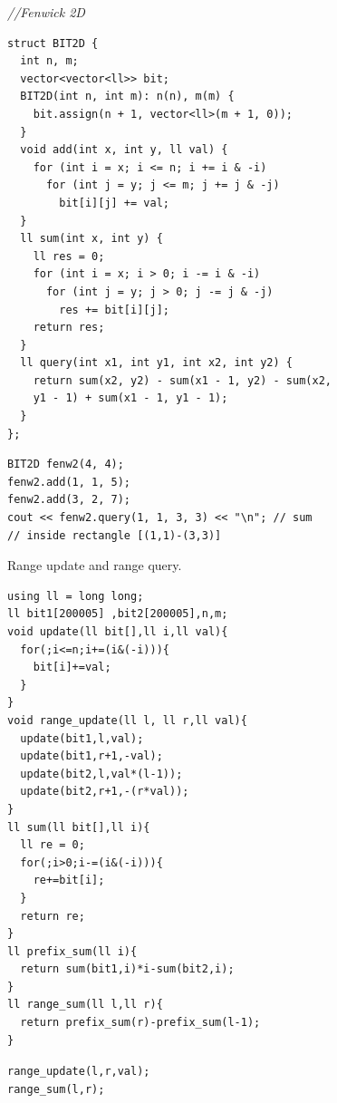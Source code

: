 \textit{//Fenwick 2D}
\begin{lstlisting}
struct BIT2D {
  int n, m;
  vector<vector<ll>> bit;
  BIT2D(int n, int m): n(n), m(m) {
    bit.assign(n + 1, vector<ll>(m + 1, 0));
  }
  void add(int x, int y, ll val) {
    for (int i = x; i <= n; i += i & -i)
      for (int j = y; j <= m; j += j & -j)
        bit[i][j] += val;
  }
  ll sum(int x, int y) {
    ll res = 0;
    for (int i = x; i > 0; i -= i & -i)
      for (int j = y; j > 0; j -= j & -j)
        res += bit[i][j];
    return res;
  }
  ll query(int x1, int y1, int x2, int y2) {
    return sum(x2, y2) - sum(x1 - 1, y2) - sum(x2,
    y1 - 1) + sum(x1 - 1, y1 - 1);
  }
};
\end{lstlisting}
\begin{lstlisting}
BIT2D fenw2(4, 4);
fenw2.add(1, 1, 5);
fenw2.add(3, 2, 7);
cout << fenw2.query(1, 1, 3, 3) << "\n"; // sum
// inside rectangle [(1,1)-(3,3)]
\end{lstlisting}

Range update and range query.
\begin{lstlisting}
using ll = long long;
ll bit1[200005] ,bit2[200005],n,m;
void update(ll bit[],ll i,ll val){
  for(;i<=n;i+=(i&(-i))){
    bit[i]+=val;
  }
}
void range_update(ll l, ll r,ll val){
  update(bit1,l,val);
  update(bit1,r+1,-val);
  update(bit2,l,val*(l-1));
  update(bit2,r+1,-(r*val));
}
ll sum(ll bit[],ll i){
  ll re = 0;
  for(;i>0;i-=(i&(-i))){
    re+=bit[i];
  }
  return re;
}
ll prefix_sum(ll i){
  return sum(bit1,i)*i-sum(bit2,i);
}
ll range_sum(ll l,ll r){
  return prefix_sum(r)-prefix_sum(l-1);
}
\end{lstlisting}
\texttt{range\_update(l,r,val);}\\
\texttt{range\_sum(l,r);}

